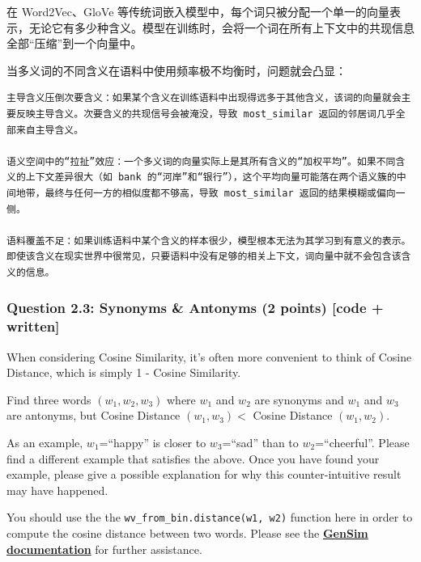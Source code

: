 \documentclass[11pt]{article}
\begin{document}
在 Word2Vec、GloVe
等传统词嵌入模型中，每个词只被分配一个单一的向量表示，无论它有多少种含义。模型在训练时，会将一个词在所有上下文中的共现信息全部``压缩''到一个向量中。

当多义词的不同含义在语料中使用频率极不均衡时，问题就会凸显：

\begin{verbatim}
主导含义压倒次要含义：如果某个含义在训练语料中出现得远多于其他含义，该词的向量就会主要反映主导含义。次要含义的共现信号会被淹没，导致 most_similar 返回的邻居词几乎全部来自主导含义。

语义空间中的“拉扯”效应：一个多义词的向量实际上是其所有含义的“加权平均”。如果不同含义的上下文差异很大（如 bank 的“河岸”和“银行”），这个平均向量可能落在两个语义簇的中间地带，最终与任何一方的相似度都不够高，导致 most_similar 返回的结果模糊或偏向一侧。

语料覆盖不足：如果训练语料中某个含义的样本很少，模型根本无法为其学习到有意义的表示。即使该含义在现实世界中很常见，只要语料中没有足够的相关上下文，词向量中就不会包含该含义的信息。
\end{verbatim}

    \subsubsection{Question 2.3: Synonyms \& Antonyms (2 points) {[}code +
written{]}}\label{question-2.3-synonyms-antonyms-2-points-code-written}

When considering Cosine Similarity, it's often more convenient to think
of Cosine Distance, which is simply 1 - Cosine Similarity.

Find three words \((w_1,w_2,w_3)\) where \(w_1\) and \(w_2\) are
synonyms and \(w_1\) and \(w_3\) are antonyms, but Cosine Distance
\((w_1,w_3) <\) Cosine Distance \((w_1,w_2)\).

As an example, \(w_1\)=``happy'' is closer to \(w_3\)=``sad'' than to
\(w_2\)=``cheerful''. Please find a different example that satisfies the
above. Once you have found your example, please give a possible
explanation for why this counter-intuitive result may have happened.

You should use the the \texttt{wv\_from\_bin.distance(w1,\ w2)} function
here in order to compute the cosine distance between two words. Please
see the
\textbf{\href{https://radimrehurek.com/gensim/models/keyedvectors.html\#gensim.models.keyedvectors.FastTextKeyedVectors.distance}{GenSim
documentation}} for further assistance.
\end{document}
